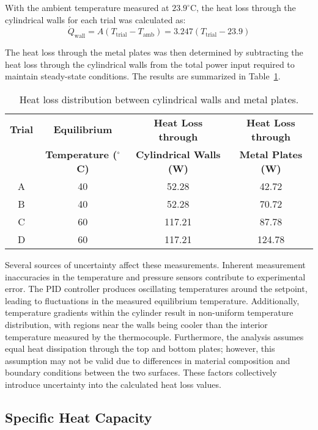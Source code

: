 \documentclass[12pt]{article}
\begin{document}
With the ambient temperature measured at \(23.9^{\circ}\)C, the heat loss through the cylindrical walls for each trial was calculated as:
\[
\dot{Q}_{\text{wall}} = A(T_{\text{trial}} - T_{\text{amb}}) = 3.247(T_{\text{trial}} - 23.9)
\]

The heat loss through the metal plates was then determined by subtracting the heat loss through the cylindrical walls from the total power input required to maintain steady-state conditions. The results are summarized in Table~\ref{tab:plateloss}.

\begin{table}[h!]
\centering
\caption{Heat loss distribution between cylindrical walls and metal plates.}
\label{tab:plateloss}
\begin{tabular}{@{}cccc@{}}
\toprule
\textbf{Trial} & \textbf{Equilibrium} & \textbf{Heat Loss through} & \textbf{Heat Loss through} \\
& \textbf{Temperature ($^{\circ}$C)} & \textbf{Cylindrical Walls (W)} & \textbf{Metal Plates (W)} \\
\midrule
A & 40 & 52.28 & 42.72 \\
B & 40 & 52.28 & 70.72 \\
C & 60 & 117.21 & 87.78 \\
D & 60 & 117.21 & 124.78 \\
\bottomrule
\end{tabular}
\end{table}

Several sources of uncertainty affect these measurements. Inherent measurement inaccuracies in the temperature and pressure sensors contribute to experimental error. The PID controller produces oscillating temperatures around the setpoint, leading to fluctuations in the measured equilibrium temperature. Additionally, temperature gradients within the cylinder result in non-uniform temperature distribution, with regions near the walls being cooler than the interior temperature measured by the thermocouple. Furthermore, the analysis assumes equal heat dissipation through the top and bottom plates; however, this assumption may not be valid due to differences in material composition and boundary conditions between the two surfaces. These factors collectively introduce uncertainty into the calculated heat loss values.

\subsection{Specific Heat Capacity}
\end{document}

